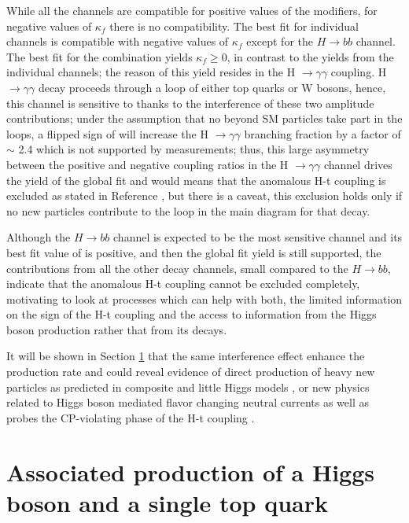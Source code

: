 While all the channels are compatible for positive values of the modifiers, for negative values of $\kappa_f$ there is no compatibility. The best fit for individual channels is compatible with negative values of $\kappa_f$ except for the $H\to bb$ channel. The best fit for the combination yields $\kappa_f\geq0$, in contrast to the yields from the individual channels; the reason of this yield resides in the H $\to \gamma \gamma$ coupling. H $\to \gamma \gamma$ decay proceeds through a loop of either top quarks or W bosons, hence, this channel is sensitive to \Ct thanks to the interference of these two amplitude contributions; under the assumption that no beyond SM particles take part in the loops, a flipped sign of \Ct will increase the H $\to \gamma \gamma$ branching fraction by a factor of $\sim$ 2.4 which is not supported by measurements; thus, this large asymmetry between the positive and negative coupling ratios in the H $\to \gamma \gamma$ channel drives the yield of the global fit and would means that the anomalous H-t coupling is excluded as stated in Reference \cite{comb_ht_couplings}, but there is a caveat, this exclusion holds only if no new particles contribute to the loop in the main diagram for that decay.

Although the $H\to bb$ channel is expected to be the most sensitive channel and its best fit value of \Ct is positive, and then the global fit yield is still supported, the contributions from all the other decay channels, small compared to the $H\to bb$, indicate that the anomalous H-t coupling cannot be excluded completely, motivating to look at \tH processes which can help with both, the limited information on the sign of the H-t coupling and the access to information from the Higgs boson production rather that from its decays.

It will be shown in Section \ref{sec:thq} that the same interference effect enhance the \tH production rate and could reveal evidence of direct production of heavy new particles as predicted in composite and little Higgs models \cite{lhiggs}, or new physics related to Higgs boson mediated flavor changing neutral currents \cite{greljo} as well as probes the CP-violating phase of the H-t coupling \cite{maltoni2, demartin}.

\section{Associated production of a Higgs boson and a single top quark}\label{sec:thq}

